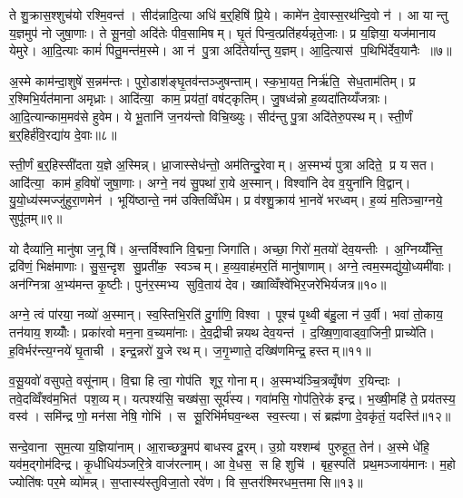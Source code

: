 ते शु॒क्रास॒श्शुच॑यो रश्मि॒वन्त॑। सीद॑न्नादि॒त्या अधि॑ ब॒र्॒हिषि॑ प्रि॒ये। कामे॑न दे॒वास्स॒रथ॑न्दि॒वो न॑। आ यान्तु य॒ज्ञमुप॑ नो जुषा॒णाः। ते सू॒नवो॒ अदि॑तेः पीव॒सामिषम्। घृ॒तं पिन्व॒त्प्रति॑हर्यन्नृते॒जाः। प्र य॒ज्ञिया॒ यज॑मानाय येमुरे। आ॒दि॒त्याः कामं॑ पितु॒मन्त॑म॒स्मे। आ न॑ पु॒त्रा अदि॑तेर्यान्तु य॒ज्ञम्। आ॒दि॒त्यास॑ प॒थिभि॑र्देव॒यानैः ॥७॥

अ॒स्मे काम॑न्दा॒शुषे॑ स॒न्नम॑न्तः। पुरो॒डाश॑ङ्घृ॒तव॑न्तञ्जुषन्ताम्। स्क॒भा॒यत॒ निर्\mbox{}ऋ॑ति॒ सेध॒ताम॑तिम्। प्र र॒श्मिभि॒र्यत॑माना अमृध्राः। आदि॑त्या॒ काम॒ प्रय॑तां॒ वष॑ट्कृतिम्। जु॒षध्व॑न्नो ह॒व्यदा॑तिय्यँजत्राः। आ॒दि॒त्यान्काम॒मव॑से हुवेम। ये भू॒तानि॑ ज॒नय॑न्तो विचि॒ख्युः। सीद॑न्तु पु॒त्रा अदि॑तेरु॒पस्थम्। स्ती॒र्णं ब॒र्॒हिर्\mbox{}ह॑वि॒रद्या॑य दे॒वाः॥८॥

स्ती॒र्णं ब॒र्॒हिस्सी॑दता य॒ज्ञे अ॒स्मिन्न्। ध्रा॒जास्सेध॑न्तो॒ अम॑तिन्दु॒रेवाम्। अ॒स्मभ्यं॑ पुत्रा अदिते॒ प्र यसत। आदि॑त्या॒ काम॑ ह॒विषो॑ जुषा॒णाः। अग्ने॒ नय॑ सु॒पथा॑ रा॒ये अ॒स्मान्। विश्वा॑नि देव व॒युना॑नि वि॒द्वान्। यु॒यो॒ध्य॑स्मज्जु॑हुरा॒णमेन॑। भूयि॑ष्ठान्ते॒ नम॑ उक्तिव्विँधेम। प्र व॑श्शु॒क्राय॑ भा॒नवे॑ भरध्वम्। ह॒व्यं म॒तिञ्चा॒ग्नये॒ सुपू॑तम्॥९॥

यो दैव्या॑नि॒ मानु॑षा ज॒नूषि॑। अ॒न्तर्विश्वा॑नि वि॒द्मना॒ जिगा॑ति। अच्छा॒ गिरो॑ म॒तयो॑ देव॒यन्तीः। अ॒ग्निय्यँ॑न्ति॒ द्रवि॑णं॒ भिक्ष॑माणाः। सु॒स॒न्दृश सु॒प्रती॑क॒ स्वञ्चम्। ह॒व्य॒वाह॑मर॒तिं मानु॑षाणाम्। अग्ने॒ त्वम॒स्मद्यु॑यो॒ध्यमी॑वाः। अन॑ग्नित्रा अ॒भ्य॑मन्त कृ॒ष्टीः। पुन॑र॒स्मभ्य सुवि॒ताय॑ देव। ख्षाव्विँश्वे॑भिर॒जरे॑भिर्यजत्र॥१०॥

अग्ने॒ त्वं पा॑रया॒ नव्यो॑ अ॒स्मान्। स्व॒स्तिभि॒रति॑ दु॒र्गाणि॒ विश्वा। पूश्च॑ पृ॒थ्वी ब॑हु॒ला न॑ उ॒र्वी। भवा॑ तो॒काय॒ तन॑याय॒ शय्योँः। प्रका॑रवो मन॒ना व॒च्यमा॑नाः। दे॒व॒द्रीचीन्नयथ देव॒यन्त॑। द॒ख्षि॒णा॒वाड्वा॒जिनी॒ प्राच्ये॑ति। ह॒विर्भर॑न्त्य॒ग्नये॑ घृ॒ताची। इन्द्र॒न्नरो॑ यु॒जे रथम्। ज॒गृ॒भ्णाते॒ दख्षि॑णमिन्द्र॒ हस्तम्॥११॥

व॒सू॒यवो॑ वसुपते॒ वसू॑नाम्। वि॒द्मा हि त्वा॒ गोप॑ति शूर॒ गोनाम्। अ॒स्मभ्य॑ञ्चि॒त्रव्वृँष॑ण र॒यिन्दाः। तवे॒दव्विँश्व॑म॒भित॑ पश॒व्यम्। यत्पश्य॑सि॒ चख्ष॑सा॒ सूर्य॑स्य। गवा॑मसि॒ गोप॑ति॒रेक॑ इन्द्र। भ॒ख्षी॒महि॑ ते॒ प्रय॑तस्य॒ वस्व॑। समि॑न्द्र णो॒ मन॑सा नेषि॒ गोभि॑। स सू॒रिभि॑र्मघव॒न्थ्स स्व॒स्त्या। सं ब्रह्म॑णा दे॒वकृ॑तं॒ यदस्ति॑॥१२॥

सन्दे॒वाना सुम॒त्या य॒ज्ञिया॑नाम्। आ॒राच्छत्रु॒मप॑ बाधस्व दू॒रम्। उ॒ग्रो यश्शम्ब॑ पुरुहूत॒ तेन॑। अ॒स्मे धे॑हि॒ यव॑म॒द्गोम॑दिन्द्र। कृ॒धीधिय॑ञ्जरि॒त्रे वाज॑रत्नाम्। आ वे॒धस॒ स हि शुचि॑। बृह॒स्पति॑ प्रथ॒मञ्जाय॑मानः। म॒हो ज्योति॑षः पर॒मे व्यो॑मन्न्। स॒प्तास्य॑स्तुविजा॒तो रवे॑ण। वि स॒प्तर॑श्मिरधम॒त्तमासि॥१३॥

